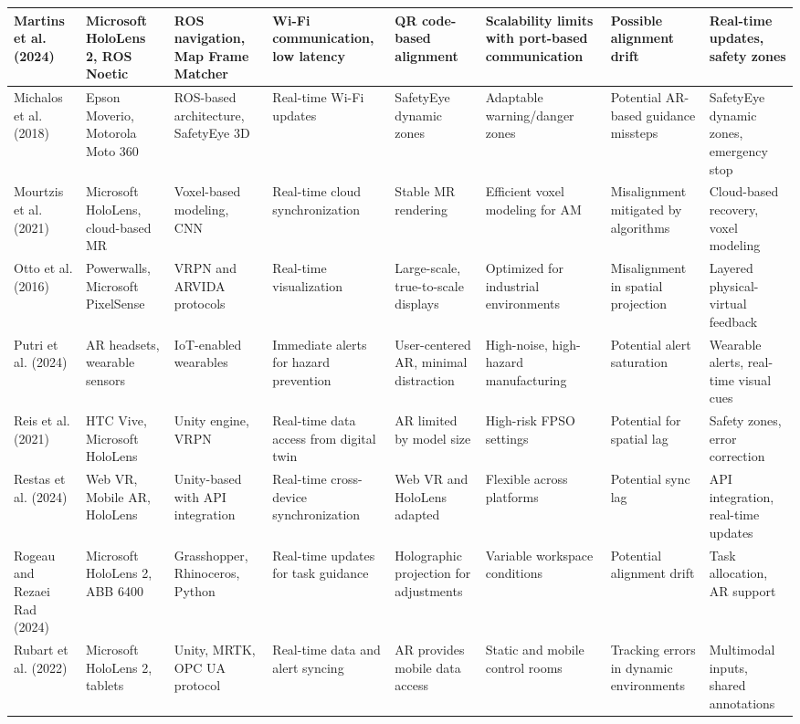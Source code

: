 {\begin{landscape}
\begin{longtable}{@{}p{1.8cm}p{1.8cm}p{1.8cm}p{1.8cm}p{1.8cm}p{1.8cm}p{1.8cm}p{1.8cm}@{}}
\midrule
Martins et al. (2024) & Microsoft HoloLens 2, ROS Noetic & ROS navigation, Map Frame Matcher & Wi-Fi communication, low latency & QR code-based alignment & Scalability limits with port-based communication & Possible alignment drift & Real-time updates, safety zones \\
\midrule
Michalos et al. (2018) & Epson Moverio, Motorola Moto 360 & ROS-based architecture, SafetyEye 3D & Real-time Wi-Fi updates & SafetyEye dynamic zones & Adaptable warning/danger zones & Potential AR-based guidance missteps & SafetyEye dynamic zones, emergency stop \\
\midrule
Mourtzis et al. (2021) & Microsoft HoloLens, cloud-based MR & Voxel-based modeling, CNN & Real-time cloud synchronization & Stable MR rendering & Efficient voxel modeling for AM & Misalignment mitigated by algorithms & Cloud-based recovery, voxel modeling \\
\midrule
Otto et al. (2016) & Powerwalls, Microsoft PixelSense & VRPN and ARVIDA protocols & Real-time visualization & Large-scale, true-to-scale displays & Optimized for industrial environments & Misalignment in spatial projection & Layered physical-virtual feedback \\
\midrule
Putri et al. (2024) & AR headsets, wearable sensors & IoT-enabled wearables & Immediate alerts for hazard prevention & User-centered AR, minimal distraction & High-noise, high-hazard manufacturing & Potential alert saturation & Wearable alerts, real-time visual cues \\
\midrule
Reis et al. (2021) & HTC Vive, Microsoft HoloLens & Unity engine, VRPN & Real-time data access from digital twin & AR limited by model size & High-risk FPSO settings & Potential for spatial lag & Safety zones, error correction \\
\midrule
Restas et al. (2024) & Web VR, Mobile AR, HoloLens & Unity-based with API integration & Real-time cross-device synchronization & Web VR and HoloLens adapted & Flexible across platforms & Potential sync lag & API integration, real-time updates \\
\midrule
Rogeau and Rezaei Rad (2024) & Microsoft HoloLens 2, ABB 6400 & Grasshopper, Rhinoceros, Python & Real-time updates for task guidance & Holographic projection for adjustments & Variable workspace conditions & Potential alignment drift & Task allocation, AR support \\
\midrule
Rubart et al. (2022) & Microsoft HoloLens 2, tablets & Unity, MRTK, OPC UA protocol & Real-time data and alert syncing & AR provides mobile data access & Static and mobile control rooms & Tracking errors in dynamic environments & Multimodal inputs, shared annotations \\

\end{longtable}
\end{landscape}}
